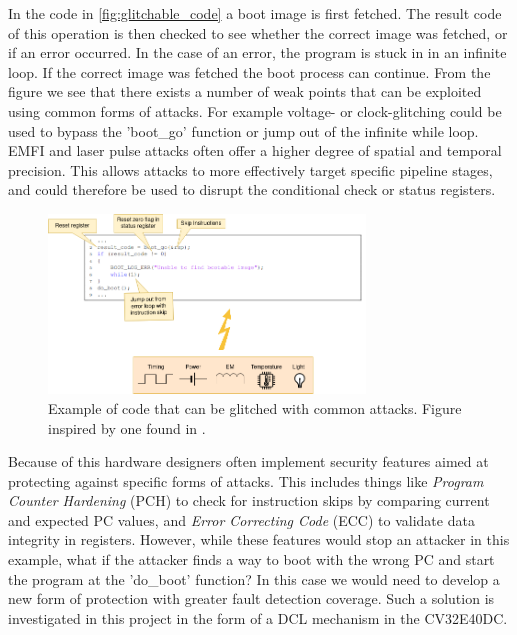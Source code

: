 In the code in \autoref{fig:glitchable_code} a boot image is first fetched. The result code of this operation is then checked to see whether the correct image was fetched, or if an error occurred. In the case of an error, the program is stuck in in an infinite loop. If the correct image was fetched the boot process can continue. From the figure we see that there exists a number of weak points that can be exploited using common forms of attacks. For example voltage- or clock-glitching could be used to bypass the 'boot\_go' function or jump out of the infinite while loop. EMFI and laser pulse attacks often offer a higher degree of spatial and temporal precision. This allows attacks to more effectively target specific pipeline stages, and could therefore be used to disrupt the conditional check or status registers\cite{intro_to_FI}. 

\begin{figure}[h!]
    \centering
    \includegraphics[width=0.75\textwidth]{docs/images/glitch_attack_whole_system.png}
    \caption{Example of code that can be glitched with common attacks. Figure inspired by one found in \cite{arm_presentation}.}
    \label{fig:glitchable_code}
\end{figure}

Because of this hardware designers often implement security features aimed at protecting against specific forms of attacks. This includes things like \textit{Program Counter Hardening} (PCH) to check for instruction skips by comparing current and expected PC values, and \textit{Error Correcting Code} (ECC) to validate data integrity in registers\cite{cv32e40s_manual}. However, while these features would stop an attacker in this example, what if the attacker finds a way to boot with the wrong PC and start the program at the 'do\_boot' function? In this case we would need to develop a new form of protection with greater fault detection coverage. Such a solution is investigated in this project in the form of a DCL mechanism in the CV32E40DC. 

